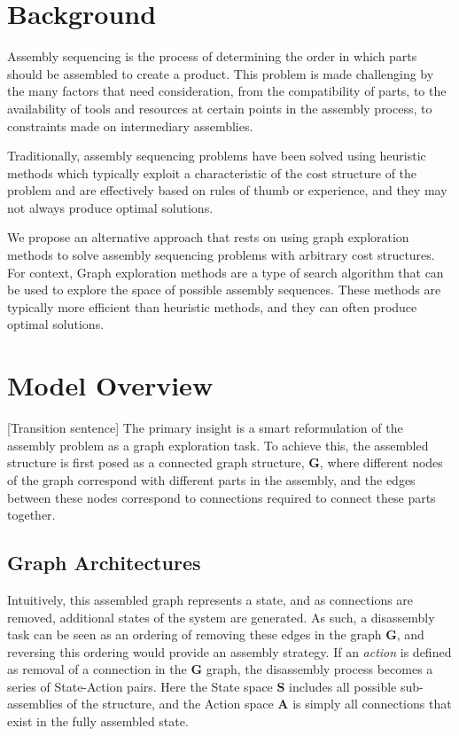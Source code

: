\documentclass{article}
\begin{document}
\section{Background}

Assembly sequencing is the process of determining the order in which parts should be assembled to create a product. This problem is made challenging by the many factors that need consideration, from the compatibility of parts, to the availability of tools and resources at certain points in the assembly process, to constraints made on intermediary assemblies.

Traditionally, assembly sequencing problems have been solved using heuristic methods which typically exploit a characteristic of the cost structure of the problem and are effectively based on rules of thumb or experience, and they may not always produce optimal solutions.

We propose an alternative approach that rests on using graph exploration methods to solve assembly sequencing problems with arbitrary cost structures. For context, Graph exploration methods are a type of search algorithm that can be used to explore the space of possible assembly sequences. These methods are typically more efficient than heuristic methods, and they can often produce optimal solutions.

\section{Model Overview}
\color{red} [Transition sentence] \color{black} The primary insight is a smart reformulation of the assembly problem as a graph exploration task. To achieve this, the assembled structure is first posed as a connected graph structure, $\mathbf{G}$, where different nodes of the graph correspond with different parts in the assembly, and the edges between these nodes correspond to connections required to connect these parts together.

\subsection{Graph Architectures}
Intuitively, this assembled graph represents a state, and as connections are removed, additional states of the system are generated. As such, a disassembly task can be seen as an ordering of removing these edges in the graph $\mathbf{G}$, and reversing this ordering would provide an assembly strategy. If an \textit{action} is defined as removal of a connection in the $\mathbf{G}$ graph, the disassembly process becomes a series of State-Action pairs. Here the State space $\mathbf{S}$
includes all possible sub-assemblies of the structure, and the Action space $\mathbf{A}$ is simply all connections that exist in the fully assembled state.
\end{document}
